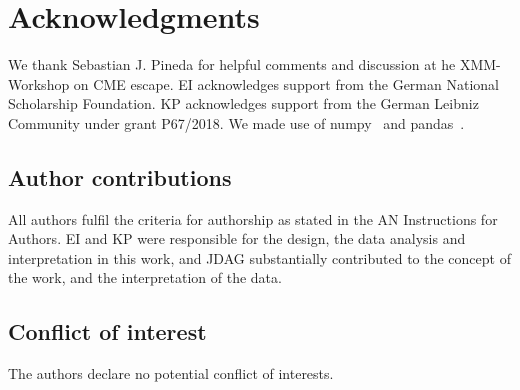 \documentclass[proof]{WileyASNA-v1}
\begin{document}

\section*{Acknowledgments}
We thank Sebastian J. Pineda for helpful comments and discussion at he XMM-Workshop on CME escape.
EI acknowledges support from the German National Scholarship Foundation. KP acknowledges support from the German Leibniz Community under grant P67/2018. We made use of numpy~\citep{numpy2020} and pandas~\citep{pandas2010,pandas2020software}.

\subsection*{Author contributions}

All authors fulfil the criteria for authorship as stated in the AN Instructions for Authors. EI and KP were responsible for the design, the data analysis and interpretation in this work, and JDAG substantially contributed to the concept of the work, and the interpretation of the data.

\subsection*{Conflict of interest}
The authors declare no potential conflict of interests.


\end{document}
